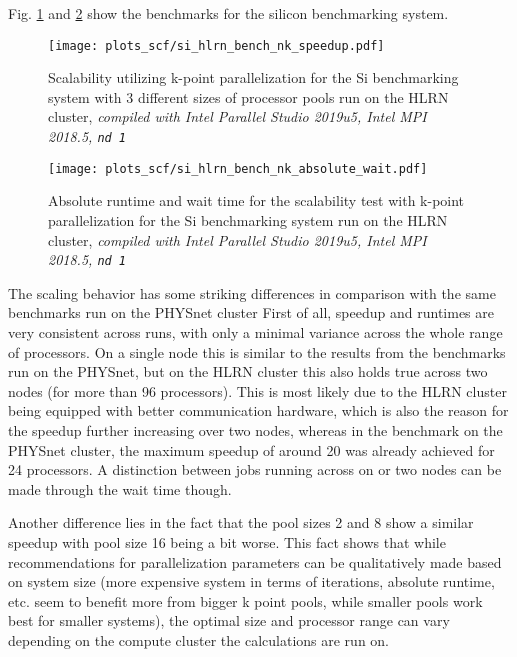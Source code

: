 \documentclass[main.tex]{subfiles}
\begin{document}
Fig. \ref{fig:scaling_scf_hlrn_nk_si_speedup} and \ref{fig:scaling_scf_hlrn_nk_si_absolute_wait} show the benchmarks for the silicon benchmarking system.
\begin{figure}[ht!]
\centering
\texttt{[image: plots\_scf/si\_hlrn\_bench\_nk\_speedup.pdf]}
\caption{Scalability utilizing k-point parallelization for the Si benchmarking system with 3 different sizes of processor pools run on the HLRN cluster, \emph{\QE compiled with Intel Parallel Studio 2019u5, Intel MPI 2018.5, \texttt{nd 1}}}
\label{fig:scaling_scf_hlrn_nk_si_speedup}
\end{figure}

\begin{figure}[ht!]
    \centering
    \texttt{[image: plots\_scf/si\_hlrn\_bench\_nk\_absolute\_wait.pdf]}
\caption{Absolute runtime and wait time for the scalability test with k-point parallelization for the Si benchmarking system run on the HLRN cluster, \emph{\QE compiled with Intel Parallel Studio 2019u5, Intel MPI 2018.5, \texttt{nd 1}}}
\label{fig:scaling_scf_hlrn_nk_si_absolute_wait}
\end{figure}
The scaling behavior has some striking differences in comparison with the same benchmarks run on the PHYSnet cluster
First of all, speedup and runtimes are very consistent across runs, with only a minimal variance across the whole range of processors.
On a single node this is similar to the results from the benchmarks run on the PHYSnet, but on the HLRN cluster this also holds true across two nodes (for more than 96 processors).
This is most likely due to the HLRN cluster being equipped with better communication hardware, which is also the reason for the speedup further increasing over two nodes, whereas in the benchmark on the PHYSnet cluster, the maximum speedup of around 20 was already achieved for 24 processors.
A distinction between jobs running across on or two nodes can be made through the wait time though.

Another difference lies in the fact that the pool sizes 2 and 8 show a similar speedup with pool size 16 being a bit worse.
This fact shows that while recommendations for parallelization parameters can be qualitatively made based on system size (more expensive system in terms of iterations, absolute runtime, etc. seem to benefit more from bigger k point pools, while smaller pools work best for smaller systems), the optimal size and processor range can vary depending on the compute cluster the calculations are run on.
\end{document}
